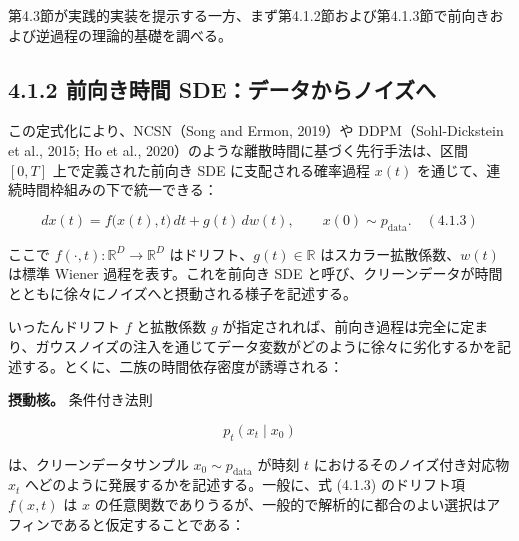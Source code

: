 第4.3節が実践的実装を提示する一方、まず第4.1.2節および第4.1.3節で前向きおよび逆過程の理論的基礎を調べる。






\subsection*{4.1.2 前向き時間 SDE：データからノイズへ}




この定式化により、NCSN（Song and Ermon, 2019）や DDPM（Sohl-Dickstein et al., 2015; Ho et al., 2020）のような離散時間に基づく先行手法は、区間 $[0,T]$ 上で定義された前向き SDE に支配される確率過程 $x(t)$ を通じて、連続時間枠組みの下で統一できる：

\[
dx(t) = f\bigl(x(t),t\bigr)\, dt + g(t)\, dw(t), \qquad x(0)\sim p_{\mathrm{data}}. \quad (4.1.3)
\]


ここで $f(\cdot,t):\mathbb{R}^D\to\mathbb{R}^D$ はドリフト、$g(t)\in\mathbb{R}$ はスカラー拡散係数、$w(t)$ は標準 Wiener 過程を表す。これを前向き SDE と呼び、クリーンデータが時間とともに徐々にノイズへと摂動される様子を記述する。

いったんドリフト $f$ と拡散係数 $g$ が指定されれば、前向き過程は完全に定まり、ガウスノイズの注入を通じてデータ変数がどのように徐々に劣化するかを記述する。とくに、二族の時間依存密度が誘導される：

\textbf{摂動核。} 条件付き法則

\[
p_t(x_t\mid x_0)
\]


は、クリーンデータサンプル $x_0\sim p_{\mathrm{data}}$ が時刻 $t$ におけるそのノイズ付き対応物 $x_t$ へどのように発展するかを記述する。一般に、式 (4.1.3) のドリフト項 $f(x,t)$ は $x$ の任意関数でありうるが、一般的で解析的に都合のよい選択はアフィンであると仮定することである：

